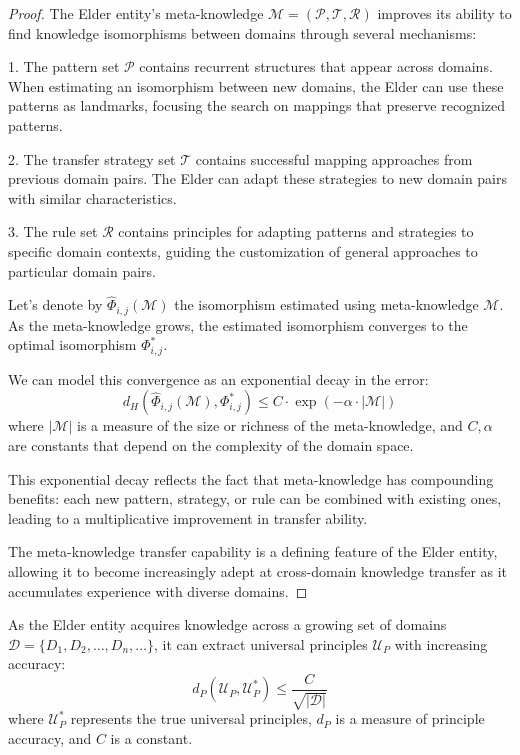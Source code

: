 \begin{proof}
The Elder entity's meta-knowledge $\mathcal{M} = (\mathcal{P}, \mathcal{T}, \mathcal{R})$ improves its ability to find knowledge isomorphisms between domains through several mechanisms:

1. The pattern set $\mathcal{P}$ contains recurrent structures that appear across domains. When estimating an isomorphism between new domains, the Elder can use these patterns as landmarks, focusing the search on mappings that preserve recognized patterns.

2. The transfer strategy set $\mathcal{T}$ contains successful mapping approaches from previous domain pairs. The Elder can adapt these strategies to new domain pairs with similar characteristics.

3. The rule set $\mathcal{R}$ contains principles for adapting patterns and strategies to specific domain contexts, guiding the customization of general approaches to particular domain pairs.

Let's denote by $\hat{\Phi}_{i,j}(\mathcal{M})$ the isomorphism estimated using meta-knowledge $\mathcal{M}$. As the meta-knowledge grows, the estimated isomorphism converges to the optimal isomorphism $\Phi_{i,j}^*$.

We can model this convergence as an exponential decay in the error:
\begin{equation}
d_H(\hat{\Phi}_{i,j}(\mathcal{M}), \Phi_{i,j}^*) \leq C \cdot \exp(-\alpha \cdot |\mathcal{M}|)
\end{equation}
where $|\mathcal{M}|$ is a measure of the size or richness of the meta-knowledge, and $C, \alpha$ are constants that depend on the complexity of the domain space.

This exponential decay reflects the fact that meta-knowledge has compounding benefits: each new pattern, strategy, or rule can be combined with existing ones, leading to a multiplicative improvement in transfer ability.

The meta-knowledge transfer capability is a defining feature of the Elder entity, allowing it to become increasingly adept at cross-domain knowledge transfer as it accumulates experience with diverse domains.
\end{proof}

\begin{theorem}
As the Elder entity acquires knowledge across a growing set of domains $\mathcal{D} = \{D_1, D_2, \ldots, D_n, \ldots\}$, it can extract universal principles $\mathcal{U}_P$ with increasing accuracy:
\begin{equation}
d_P(\mathcal{U}_P, \mathcal{U}_P^*) \leq \frac{C}{\sqrt{|\mathcal{D}|}}
\end{equation}
where $\mathcal{U}_P^*$ represents the true universal principles, $d_P$ is a measure of principle accuracy, and $C$ is a constant.
\end{theorem}


